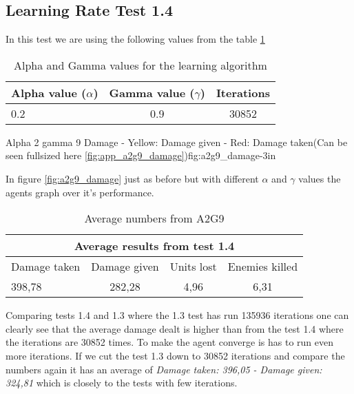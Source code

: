\subsection*{Learning Rate Test 1.4}
In this test we are using the following values from the table \ref{a2g9_table}


\begin{centering}
\begin{table}[H]
 \begin{tabular}{|l|c|c|}
	\hline
		Alpha value ($\alpha$) & Gamma value ($\gamma$) & Iterations\\
	\hline
		0.2 & 0.9 & 30852 \\
	\hline
\end{tabular}
\label{a2g9_table}
\caption{Alpha and Gamma values for the learning algorithm}
\end{table}
\end{centering}

			{Alpha 2 gamma 9 Damage - Yellow: Damage given - Red: Damage taken(Can be seen fullsized here \ref{fig:app_a2g9_damage})}{fig:a2g9_damage}{-3in}

In figure \ref{fig:a2g9_damage} just as before but with different $\alpha$ and $\gamma$ values the agents graph over it's performance.




\begin{centering}
\begin{table}
 \begin{tabular}{|l|c|c|c|}
	\multicolumn{4}{c}{Average results from test 1.4} \\
	\hline
		Damage taken & Damage given & Units lost & Enemies killed\\
	\hline
		398,78 & 282,28 & 4,96 & 6,31 \\
		\hline
\end{tabular}

\label{test1.4}
\caption{Average numbers from A2G9}
\end{table}
\end{centering}


Comparing tests 1.4 and 1.3 where the 1.3 test has run 135936 iterations one can clearly see that the average damage dealt is higher than from the test 1.4 where the iterations are 30852 times. To make the agent converge is has to run even more iterations. If we cut the test 1.3 down to 30852 iterations and compare the numbers again it has an average of \textit{Damage taken: 396,05 - Damage given: 324,81} which is closely to the tests with few iterations.